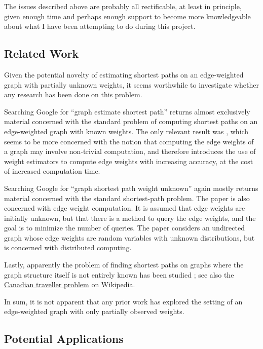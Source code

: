 The issues described above are probably all rectificable, at least in principle, given enough time and perhaps enough support to become more knowledgeable about what I have been attempting to do during this project.

\subsection{Related Work}

Given the potential novelty of estimating shortest paths on an edge-weighted graph with partially unknown weights, it seems worthwhile to investigate whether any research has been done on this problem.

Searching Google for ``graph estimate shortest path'' returns almost exclusively material concerned with the standard problem of computing shortest paths on an edge-weighted graph with known weights. The only relevant result was \cite{weiss2022generalization}, which seems to be more concerned with the notion that computing the edge weights of a graph may involve non-trivial computation, and therefore introduces the use of weight estimators to compute edge weights with increasing accuracy, at the cost of increased computation time.

Searching Google for ``graph shortest path weight unknown'' again mostly returns material concerned with the standard shortest-path problem. The paper \cite{szepesvari2004shortest} is also concerned with edge weight computation. It is assumed that edge weights are initially unknown, but that there is a method to query the edge weights, and the goal is to minimize the number of queries. The paper \cite{tehrani2013distributed} considers an undirected graph whose edge weights are random variables with unknown distributions, but is concerned with distributed computing.

Lastly, apparently the problem of finding shortest paths on graphs where the graph structure itself is not entirely known has been studied \cite{papadimitriou1991shortest}; see also the \href{https://en.wikipedia.org/wiki/Canadian_traveller_problem#:~:text=In%20computer%20science%20and%20graph,a%20certain%20%22realization%20restriction.%22}{Canadian traveller problem} on Wikipedia.

In sum, it is not apparent that any prior work has explored the setting of an edge-weighted graph with only partially observed weights.

\subsection{Potential Applications}\label{sec:pot_app}

